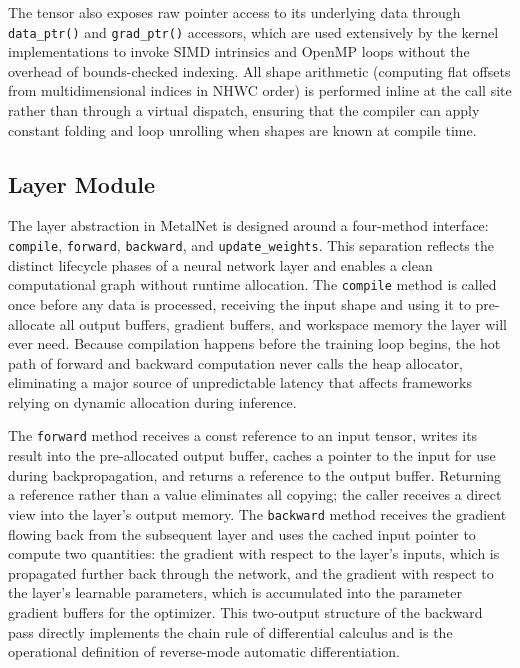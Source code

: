 \documentclass[12pt,oneside,a4paper]{report}
\begin{document}
The tensor also exposes raw pointer access to its underlying data through \texttt{data\_ptr()} and \texttt{grad\_ptr()} accessors, which are used extensively by the kernel implementations to invoke SIMD intrinsics and OpenMP loops without the overhead of bounds-checked indexing. All shape arithmetic (computing flat offsets from multidimensional indices in NHWC order) is performed inline at the call site rather than through a virtual dispatch, ensuring that the compiler can apply constant folding and loop unrolling when shapes are known at compile time.

\subsection{Layer Module}

The layer abstraction in MetalNet is designed around a four-method interface: \texttt{compile}, \texttt{forward}, \texttt{backward}, and \texttt{update\_weights}. This separation reflects the distinct lifecycle phases of a neural network layer and enables a clean computational graph without runtime allocation. The \texttt{compile} method is called once before any data is processed, receiving the input shape and using it to pre-allocate all output buffers, gradient buffers, and workspace memory the layer will ever need. Because compilation happens before the training loop begins, the hot path of forward and backward computation never calls the heap allocator, eliminating a major source of unpredictable latency that affects frameworks relying on dynamic allocation during inference.

The \texttt{forward} method receives a const reference to an input tensor, writes its result into the pre-allocated output buffer, caches a pointer to the input for use during backpropagation, and returns a reference to the output buffer. Returning a reference rather than a value eliminates all copying; the caller receives a direct view into the layer's output memory. The \texttt{backward} method receives the gradient flowing back from the subsequent layer and uses the cached input pointer to compute two quantities: the gradient with respect to the layer's inputs, which is propagated further back through the network, and the gradient with respect to the layer's learnable parameters, which is accumulated into the parameter gradient buffers for the optimizer. This two-output structure of the backward pass directly implements the chain rule of differential calculus and is the operational definition of reverse-mode automatic differentiation.
\end{document}
